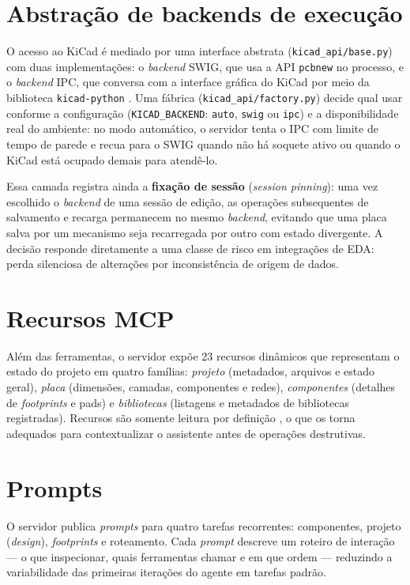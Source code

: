\section{Abstração de backends de execução}

O acesso ao KiCad é mediado por uma interface abstrata
(\texttt{kicad\_api/base.py}) com duas implementações: o \emph{backend} SWIG,
que usa a API \texttt{pcbnew} no processo, e o \emph{backend} IPC, que
conversa com a interface gráfica do KiCad por meio da biblioteca
\texttt{kicad-python} \citep{kicaddev}. Uma fábrica
(\texttt{kicad\_api/factory.py}) decide qual usar conforme a configuração
(\texttt{KICAD\_BACKEND}: \texttt{auto}, \texttt{swig} ou \texttt{ipc}) e a
disponibilidade real do ambiente: no modo automático, o servidor tenta o IPC
com limite de tempo de parede e recua para o SWIG quando não há soquete ativo
ou quando o KiCad está ocupado demais para atendê-lo.

Essa camada registra ainda a \textbf{fixação de sessão} (\emph{session
pinning}): uma vez escolhido o \emph{backend} de uma sessão de edição, as
operações subsequentes de salvamento e recarga permanecem no mesmo
\emph{backend}, evitando que uma placa salva por um mecanismo seja recarregada
por outro com estado divergente. A decisão responde diretamente a uma classe
de risco em integrações de EDA: perda silenciosa de alterações por
inconsistência de origem de dados.

\section{Recursos MCP}

Além das ferramentas, o servidor expõe 23 recursos dinâmicos que representam
o estado do projeto em quatro famílias: \emph{projeto} (metadados, arquivos e
estado geral), \emph{placa} (dimensões, camadas, componentes e redes),
\emph{componentes} (detalhes de \emph{footprints} e pads) e \emph{bibliotecas}
(listagens e metadados de bibliotecas registradas). Recursos são somente
leitura por definição \citep{mcp2025docs}, o que os torna adequados para
contextualizar o assistente antes de operações destrutivas.

\section{Prompts}

O servidor publica \emph{prompts} para quatro tarefas recorrentes:
componentes, projeto (\emph{design}), \emph{footprints} e roteamento. Cada
\emph{prompt} descreve um roteiro de interação --- o que inspecionar, quais
ferramentas chamar e em que ordem --- reduzindo a variabilidade das primeiras
iterações do agente em tarefas padrão.

